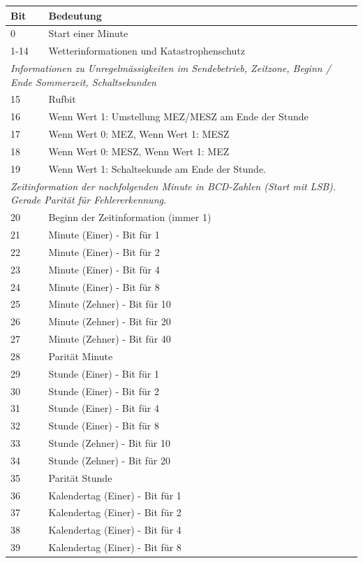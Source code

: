 \begin{longtable}{p{1cm} p{13cm}}
\textbf{Bit} & \textbf{Bedeutung} \\ \hline \endhead
0 & Start einer Minute \\
1-14 & Wetterinformationen und Katastrophenschutz \\ \hline
\multicolumn{2}{p{14cm}}{\textit{Informationen zu Unregelmässigkeiten im Sendebetrieb, Zeitzone, Beginn / Ende Sommerzeit, Schaltsekunden}}  \\ \hline
15 & Rufbit \\
16 & Wenn Wert 1: Umstellung MEZ/MESZ am Ende der Stunde \\
17 & Wenn Wert 0: MEZ, Wenn Wert 1: MESZ \\
18 & Wenn Wert 0: MESZ, Wenn Wert 1: MEZ \\
19 & Wenn Wert 1: Schaltsekunde am Ende der Stunde. \\ \hline
\multicolumn{2}{p{14cm}}{\textit{Zeitinformation der nachfolgenden Minute in BCD-Zahlen (Start mit LSB). Gerade Parität für Fehlererkennung.}}  \\ \hline
20 & Beginn der Zeitinformation (immer 1) \\
21 & Minute (Einer) - Bit für 1 \\
22 & Minute (Einer) - Bit für 2 \\
23 & Minute (Einer) - Bit für 4 \\
24 & Minute (Einer) - Bit für 8 \\
25 & Minute (Zehner) - Bit für 10 \\
26 & Minute (Zehner) - Bit für 20 \\
27 & Minute (Zehner) - Bit für 40 \\
28 & Parität Minute \\ \hline
29 & Stunde (Einer) - Bit für 1 \\
30 & Stunde (Einer) - Bit für 2 \\
31 & Stunde (Einer) - Bit für 4 \\
32 & Stunde (Einer) - Bit für 8 \\
33 & Stunde (Zehner) - Bit für 10 \\
34 & Stunde (Zehner) - Bit für 20 \\
35 & Parität Stunde \\ \hline
36 & Kalendertag (Einer) - Bit für 1 \\
37 & Kalendertag (Einer) - Bit für 2 \\
38 & Kalendertag (Einer) - Bit für 4 \\
39 & Kalendertag (Einer) - Bit für 8 \\

\end{longtable}
